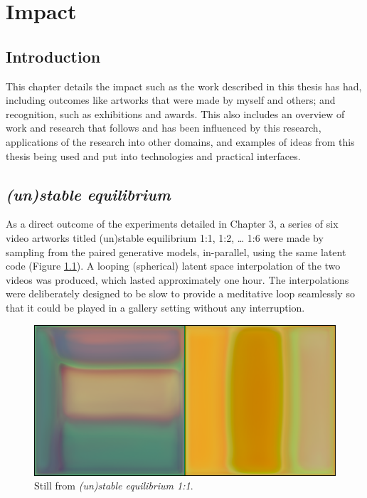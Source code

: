 \chapter{Impact}
\label{ch:impact}

\section{Introduction}

This chapter details the impact such as the work described in this thesis has had, including outcomes like artworks that were made by myself and others; and recognition, such as exhibitions and awards. 
This also includes an overview of work and research that follows and has been influenced by this research, applications of the research into other domains, and examples of ideas from this thesis being used and put into technologies and practical interfaces. 

\section{\textit{(un)stable equilibrium}}
\label{c7:sec:unstable_eq}

As a direct outcome of the experiments detailed in Chapter 3, a series of six video artworks titled (un)stable equilibrium 1:1, 1:2, … 1:6 were made by sampling from the paired generative models, in-parallel, using the same latent code (Figure \ref{fig:c7:ue_still}). 
A looping (spherical) latent space interpolation \citep{white2016sampling} of the two videos was produced, which lasted approximately one hour. 
The interpolations were deliberately designed to be slow to provide a meditative loop seamlessly so that it could be played in a gallery setting without any interruption.

\begin{figure}[!htb]
    \centering
    \captionsetup{justification=centering}
    \includegraphics[width=1\textwidth]{figures/c7_impact/ue_1_1_still.png}
    \caption{Still from \textit{(un)stable equilibrium 1:1}.}
    \label{fig:c7:ue_still}
\end{figure}

